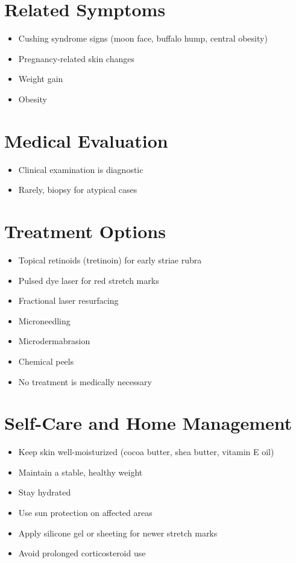 \section*{Related Symptoms}
\begin{itemize}
\item Cushing syndrome signs (moon face, buffalo hump, central obesity)
\item Pregnancy-related skin changes
\item Weight gain
\item Obesity
\end{itemize}

\section*{Medical Evaluation}
\begin{itemize}
\item Clinical examination is diagnostic
\item Rarely, biopsy for atypical cases
\end{itemize}

\section*{Treatment Options}
\begin{itemize}
\item Topical retinoids (tretinoin) for early striae rubra
\item Pulsed dye laser for red stretch marks
\item Fractional laser resurfacing
\item Microneedling
\item Microdermabrasion
\item Chemical peels
\item No treatment is medically necessary
\end{itemize}

\section*{Self-Care and Home Management}
\begin{itemize}
\item Keep skin well-moisturized (cocoa butter, shea butter, vitamin E oil)
\item Maintain a stable, healthy weight
\item Stay hydrated
\item Use sun protection on affected areas
\item Apply silicone gel or sheeting for newer stretch marks
\item Avoid prolonged corticosteroid use
\end{itemize}

